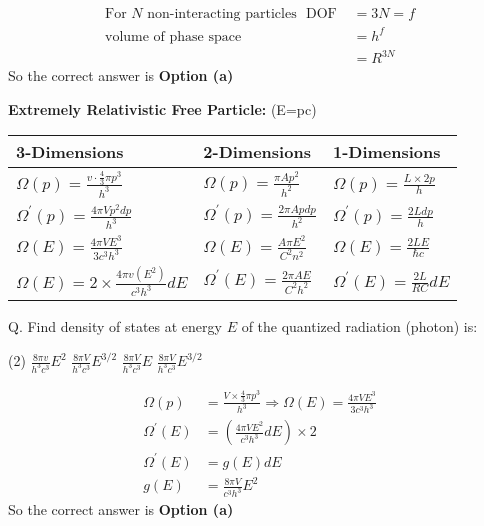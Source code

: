 \begin{answer}
	\begin{align*}
	\text{For $N$ non-interacting particles }\text { DOF }&=3 N=f\\
	\text{volume of phase space }&=h^{f}\\
	&=R^{3 N}
	\end{align*}
	So the correct answer is \textbf{Option (a)}
\end{answer}
\textbf{Extremely Relativistic Free Particle: }(E=pc)\\
\renewcommand*{\arraystretch}{1.8}
\begin{tabular}{|p{4cm}|p{4cm}|p{4cm}|}
	\hline
	3-Dimensions & 2-Dimensions & 1-Dimensions\\\hline
	$\Omega(p)=\frac{v \cdot \frac{4}{3} \pi p^{3}}{h^{3}}$&$\Omega(p)=\frac{\pi A p^{2}}{h^{2}}$&$\Omega(p)=\frac{L \times 2 p}{h}$\\
	$\Omega^{\prime}(p)=\frac{4 \pi V p^{2} d p}{h^{3}}$&$\Omega^{\prime}(p)=\frac{2 \pi A p d p}{h^{2}}$&$\Omega^{\prime}(p)=\frac{2 L d p}{h}$\\\hline
	$\Omega(E)=\frac{4 \pi V E^{3}}{3 c^{3} h^{3}}$&$\Omega(E)=\frac{A \pi E^{2}}{C^{2} n^{2}}$&$\Omega(E)=\frac{2 L E}{\hbar c}$\\
	$\Omega(E)=2 \times \frac{4 \pi v\left(E^{2}\right)}{c^{3} h^{3}} d E$&$\Omega^{\prime}(E)=\frac{2 \pi A E}{C^{2} h^{2}}$&$\Omega^{\prime}(E)=\frac{2 L}{R C} d E$\\\hline
\end{tabular}
Q. Find density of states at energy $E$ of the quantized radiation (photon) is:
 \begin{tasks}(2)
	\task[\textbf{a.}]$\frac{8 \pi v}{h^{3} c^{3}} E^{2}$
	\task[\textbf{b.}]$\frac{8 \pi V}{h^{3} c^{3}} E^{3 / 2}$
	\task[\textbf{c.}]$\frac{8 \pi V}{h^{3} c^{3}} E$
	\task[\textbf{d.}] $\frac{8 \pi V}{h^{3} c^{3}} E^{3 / 2}$
\end{tasks}
\begin{answer}
	\begin{align*}
	\Omega(p)&=\frac{V \times \frac{4}{3} \pi p^{3}}{h^{3}} \Rightarrow \Omega(E)=\frac{4 \pi V E^{3}}{3 c^{3} h^{3}}\\
	\Omega^{\prime}(E)&=\left(\frac{4 \pi V E^{2}}{c^{3} h^{3}} d E\right) \times 2\\
	\Omega^{\prime}(E)&=g(E) d E\\
	g(E)&=\frac{8 \pi V}{c^{3} h^{3}} E^{2}
	\end{align*}
	So the correct answer is \textbf{Option (a)}
\end{answer}
